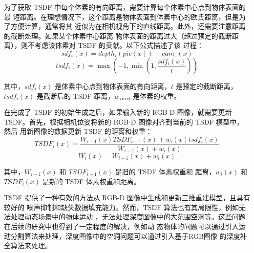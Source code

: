 \par 为了获取 TSDF 中每个体素的有向距离，需要计算每个体素中心点到物体表面的最
短距离。在理想情况下，这个距离是物体表面到体素中心的欧氏距离，但是为了方便计算，通常将其
近似为在相机视角下的直线距离。此外，还需要注意距离的截断处理。如果某个体素中心距离
物体表面的距离过大（超过预定的截断距离），则不考虑该体素对 TSDF 的贡献。以下公式描述了该
过程：
\begin{equation}
	sdf_i(x) = depth_i(pic(x)) - cam_z(x)
\end{equation}
\begin{equation}
	tsdf_i(x) = \max(-1, \min(1, \frac{sdf_i(x)}{t}))
\end{equation}

\par 其中，$sdf_i(x)$ 是体素中心点到物体表面的有向距离，$t$ 是预定的截断距离，
$tsdf_i(x)$ 是截断后的 TSDF 距离，$w_{\text{{voxel}}}$ 是体素的权重。

\par 在完成了 TSDF 的初始生成之后，如果输入新的 RGB-D 图像，就需要更新 TSDF。首先，根据相机位姿将新的 RGB-D 图像对齐到当前的 TSDF 模型中，然后
用新图像的数据更新 TSDF 的距离和权重：
\begin{equation}
	TSDF_i(x) = \frac{W_{i-1}(x)TSDF_{i-1}(x) + w_i(x)tsdf_i(x)}{W_{i-1}(x) + w_i(x)}
\end{equation}
\begin{equation}
	W_i(x) = W_{i-1}(x) + w_i(x)
\end{equation}

\par 其中，$W_{i-1}(x)$ 和 $TSDF_{i-1}(x)$ 是旧的 TSDF 体素权重和
距离，$w_i(x)$ 和 $TSDF_i(x)$ 是新的 TSDF 体素权重和距离。

\par TSDF 提供了一种有效的方法从 RGB-D 图像中生成和更新三维重建模型，且具有较好的
噪声抑制和缺失数据填充能力。然而，TSDF 算法也有其局限性，例如无法处理动态场景中的物体运动
，无法处理深度图像中的大范围空洞等。这些问题在后续的研究中也得到了一定程度的解决，例如动
态物体的问题可以通过引入运动分割算法来处理，深度图像中的空洞问题可以通过引入基于RGB图像
的深度补全算法来处理。